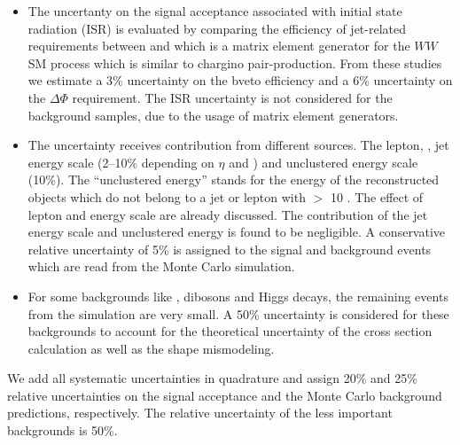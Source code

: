 \begin{itemize}
\item The uncertanty on the signal acceptance associated with initial state
  radiation (ISR) is evaluated by comparing the efficiency of jet-related
  requirements between \PYTHIA and \MADGRAPH which is a matrix element generator 
  for the $WW$ SM process which
  is similar to chargino pair-production.  From these studies we estimate
  a 3\% uncertainty on the bveto efficiency and a 6\% uncertainty on the
  $\Delta \Phi$ requirement.
  The ISR uncertainty is not considered for the background samples, due to the
  usage of  matrix element  generators.


\item The \MET uncertainty receives contribution from different sources. The lepton, \Tau, jet energy scale 
(2–10\% depending on $\eta$ and \PT) and unclustered energy scale (10\%). The ``unclustered energy'' stands for the energy of the 
reconstructed objects which do not belong to a jet or lepton with \PT $>$ 10 \GEV.
The effect of lepton and \Tau energy scale are already discussed. The contribution of the jet energy scale and unclustered energy is 
found to be negligible. A conservative relative uncertainty of 5\% is assigned to the signal and background events which are read from the 
Monte Carlo simulation.
\item For some backgrounds like \ttbar,  dibosons and Higgs decays, the remaining 
events from the simulation are very small. A 50\% uncertainty is considered for these backgrounds to account for the theoretical uncertainty of the
cross section calculation as well as the shape mismodeling.
\end{itemize}


\noindent We add all systematic uncertainties in quadrature and assign 
 20\% and 25\% relative uncertainties on the signal
acceptance and the Monte Carlo background predictions, respectively. The relative uncertainty of the 
less important backgrounds is 50\%.

